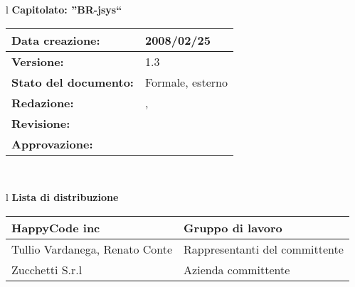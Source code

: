 


\newcommand{\lv}{ 1.3 } %
\newcommand{\dt}{ Manuale Utente }%
\newcommand{\Grammatica}{} %

\begin{center}
\thispagestyle{plain}
\begin{table}[htbp]
\large{
\begin{tabular}{l}
\Large{\textbf{\textsf{Capitolato: ''BR-jsys``}}} \\
\begin{tabular}{|p{6cm}|p{6cm}|} \hline
\textbf{Data creazione:} & 2008/02/25 \\ \hline
\textbf{Versione:} & \lv \\ \hline
\textbf{Stato del documento:} & Formale, esterno \\ \hline
\textbf{Redazione:} &  \AT, \LA \\ \hline
\textbf{Revisione:} & \FC \\ \hline
\textbf{Approvazione:} & \MM \\ \hline
\end{tabular} \\
\end{tabular}
}
\end{table}

\begin{table}[hbtp]
\large{
\begin{tabular}{l}
\Large{\textbf{\textsf{Lista di distribuzione}}} \\

\begin{tabular}{|p{6cm}|p{6cm}|} \hline
{HappyCode inc}& Gruppo di lavoro\\ \hline
{Tullio Vardanega, Renato Conte}& Rappresentanti del committente \\ \hline
{Zucchetti S.r.l}& Azienda committente\\ \hline
\end{tabular} \\
\end{tabular}
}
\end{table}
\begin{table}[hbtp]


\end{table}
\end{center}
